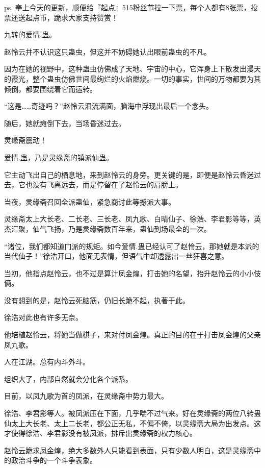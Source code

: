 
\begin{this_body}

ps. 奉上今天的更新，顺便给『起点』515粉丝节拉一下票，每个人都有8张票，投票还送起点币，跪求大家支持赞赏！

九转的爱情.蛊。

赵怜云并不认识这只蛊虫，但这并不妨碍她认出眼前蛊虫的不凡。

因为在她的视野中，这种蛊虫仿佛成了天地、宇宙的中心，它浑身上下散发出漫天的霞光，整个蛊虫仿佛世间最绚烂的火焰燃烧。一切的事实，世间的万物都要为其倾倒，都要围绕着它而运转。

“这是……奇迹吗？”赵怜云泪流满面，脑海中浮现出最后一个念头。

随后，她就瘫倒下去，当场昏迷过去。

灵缘斋震动！

爱情.蛊，乃是灵缘斋的镇派仙蛊。

它主动飞出自己的栖息地，来到赵怜云的身旁。更关键的是，即便是赵怜云昏迷过去，它也没有飞离远去，而是停留在了赵怜云的肩膀上。

当夜，灵缘斋召回全派蛊仙，紧急商讨此等撼派大事。

灵缘斋太上大长老、二长老、三长老、凤九歌、白晴仙子、徐浩、李君影等等，英杰汇聚，仙气飞扬，乃是灵缘斋数百年来，蛊仙到场最全的一次。

“诸位，我们都知道门派的规矩。如今爱情.蛊已经认可了赵怜云，那她就是本派的当代仙子！”徐浩开口，他面无表情，但语气中却透露出一丝狂喜之意。

当初，他指点赵怜云，也不过是算计凤金煌，打击她的名望，抬升赵怜云的小小伎俩。

没有想到的是，赵怜云死脑筋，仍旧长跪不起，执著于此。

徐浩对此也有许多无奈。

他培植赵怜云，将她当做棋子，来对付凤金煌。真正的目的在于打击凤金煌的父亲凤九歌。

人在江湖。总有内斗外斗。

组织大了，内部自然就会分化各个派系。

目前，以凤九歌为首的凤派，在灵缘斋中势力最大。

徐浩、李君影等人。被凤派压在下面，几乎喘不过气来。好在灵缘斋的两位八转蛊仙太上大长老、太上二长老，都公正无私，不偏不倚，以灵缘斋大局为出发点。这才使得徐浩、李君影没有被凤派，排斥出灵缘斋的权力核心。

赵怜云跪求凤金煌，绝大多数外人只能看到表面，只有少数人明白，这是灵缘斋中的政治斗争的一个斗争表象。


\end{this_body}
